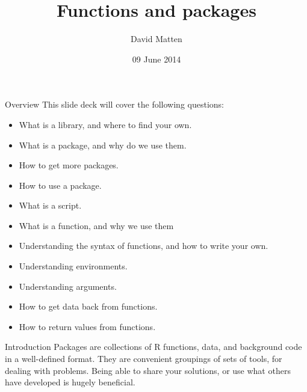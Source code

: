 \documentclass{beamer}\usepackage[]{graphicx}\usepackage[]{color}
\begin{document}
\title{Functions and packages}
\author{David Matten}
\date{09 June 2014}


\maketitle


\begin{frame}[fragile]{Overview}
This slide deck will cover the following questions:
\begin{itemize}
\item What is a library, and where to find your own.
\item What is a package, and why do we use them.
\item How to get more packages.
\item How to use a package.
\item What is a script.
\item What is a function, and why we use them
\item Understanding the syntax of functions, and how to write your own.
\item Understanding environments.
\item Understanding arguments.
\item How to get data back from functions.
\item How to return values from functions.
\end{itemize}

\end{frame}


\begin{frame}[fragile]{Introduction}
Packages are collections of R functions, data, and background code in a well-defined format.
\linebreak
\linebreak
They are convenient groupings of sets of tools, for dealing with problems.
\linebreak
\linebreak
Being able to share your solutions, or use what others have developed is hugely beneficial.
\end{frame}
\end{document}

